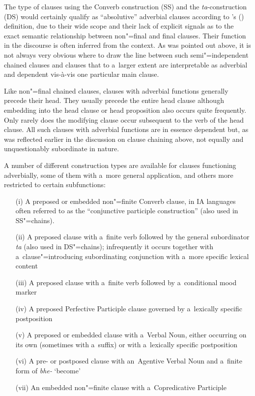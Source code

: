 The type of clauses using the Converb construction (SS) and the \textit{ta}-construction (DS) would certainly qualify as ``absolutive'' adverbial clauses according to \citeauthor{thompsonetal2007}'s (\citeyear[264--266]{thompsonetal2007}) definition, due to their wide scope and their lack of explicit signals as to the exact semantic relationship between non"=final and final clauses. Their function in the discourse is often inferred from the context. As was pointed out above, it is not always very obvious where to draw the line between such semi"=independent chained clauses and clauses that to a~larger extent are interpretable as adverbial and dependent vis-à-vis one particular main clause. 



Like non"=final chained clauses, clauses with adverbial functions generally precede their head. They usually precede the entire head clause although embedding into the head clause or head proposition also occurs quite frequently. Only rarely does the modifying clause occur subsequent to the verb of the head clause. All such clauses with adverbial functions are in essence dependent but, as was reflected earlier in the discussion on clause chaining above, not equally and unquestionably subordinate in nature. 



A number of different construction types are available for clauses functioning adverbially, some of them with a~more general application, and others more restricted to certain subfunctions:


\begin{enumerate}
\item[(i)] A preposed or embedded non"=finite Converb clause, in IA languages often referred to as the ``conjunctive participle construction'' (also used in SS"=chains).

\item[(ii)] A preposed clause with a~finite verb followed by the general subordinator \textit{ta} (also used in DS"=chains); infrequently it occurs together with a~clause"=introducing subordinating conjunction with a~more specific lexical content

\item[(iii)] A preposed clause with a~finite verb followed by a~conditional mood marker

\item[(iv)] A preposed Perfective Participle clause governed by a~lexically specific postposition

\item[(v)] A preposed or embedded clause with a~Verbal Noun, either occurring on its own (sometimes with a~suffix) or with a~lexically specific postposition

\item[(vi)] A pre- or postposed clause with an~Agentive Verbal Noun and a~finite form of \textit{bhe-} `become'

\item[(vii)] An embedded non"=finite clause with a~Copredicative Participle
\end{enumerate}

